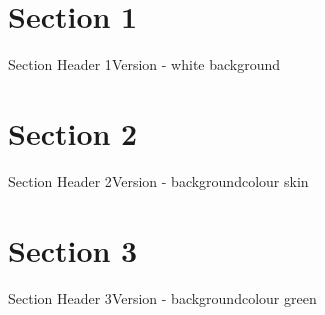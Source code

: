 \documentclass[10pt]{beamer} %
\begin{document}
\section{Section 1}
{\sectionheaderWhite %
\begin{frame}{Section Header 1}{Version - white background}
\end{frame}
}

\section{Section 2}
{\sectionheaderSkin %
\begin{frame}{Section Header 2}{Version - backgroundcolour skin}
\end{frame}
}

\section{Section 3}
{\sectionheaderGreen %
\begin{frame}{Section Header 3}{Version - backgroundcolour green}
\end{frame}
}

\end{document}
